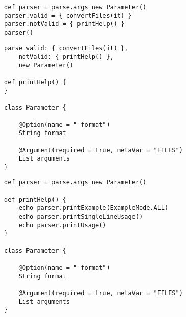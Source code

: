 \begin{lstlisting}[style=Groovybash, label={lst:example_arguments_parse1}, title={%
Storing the parse command in a variable and set 
the arguments and parse the command line arguments at a later point.}]
def parser = parse.args new Parameter()
parser.valid = { convertFiles(it) }
parser.notValid = { printHelp() }
parser()
\end{lstlisting}

\begin{lstlisting}[style=Groovybash, label={lst:example_arguments_parse2}, title={%
Parse command line arguments; valid and not-valid 
closures are called depending on whether the arguments are valid.}]
parse valid: { convertFiles(it) },
    notValid: { printHelp() },
    new Parameter()
    
def printHelp() {
}

class Parameter {

    @Option(name = "-format")
    String format

    @Argument(required = true, metaVar = "FILES")
    List arguments
}

\end{lstlisting}

\begin{lstlisting}[style=Groovybash, label={lst:example_arguments_parse3}, title={%
Print example and usage.}]
def parser = parse.args new Parameter()
    
def printHelp() {
    echo parser.printExample(ExampleMode.ALL)
    echo parser.printSingleLineUsage()
    echo parser.printUsage()
}

class Parameter {

    @Option(name = "-format")
    String format

    @Argument(required = true, metaVar = "FILES")
    List arguments
}

\end{lstlisting}

